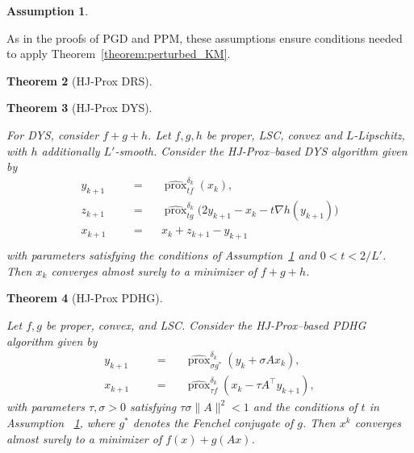 \documentclass{article}
\newcommand{\prox}{\operatorname{prox}}
\newcommand{\amp}{\mathop{\:\:\,}\nolimits}
\theoremstyle{plain}
\newtheorem{theorem}{Theorem}[section]
\theoremstyle{definition}
\newtheorem{assumption}[theorem]{Assumption}
\theoremstyle{remark}
\newtheorem{remark}[theorem]{Remark}
\begin{document}
\begin{assumption}
    \label{assump: fixed t}
\end{assumption}
As in the proofs of PGD and PPM, these assumptions ensure conditions needed to apply  Theorem~\ref{theorem:perturbed_KM}. 

\begin{theorem}[HJ-Prox DRS]
    \label{theorem:hjdrs}
\end{theorem}

\newcommand{\dysTheorem}[1]{
For DYS, consider $f + g + h$. Let $f,g,h$ be proper, LSC, convex and $L$-Lipschitz, with $h$ additionally $L'$-smooth. Consider the HJ-Prox–based DYS algorithm given by
    \begin{equation}
        \begin{split}
        y_{k+1} & \amp = \amp \widehat{\prox}^{\delta_k}_{tf}(x_k), \\
        z_{k+1} & \amp = \amp \widehat{\prox}^{\delta_k}_{tg}\bigl(2y_{k+1} - x_k - t \nabla h(y_{k+1})\bigr)\\
        x_{k+1} & \amp = \amp x_k + z_{k+1} - y_{k+1}\\
        \end{split}
    \end{equation}
    with parameters satisfying 
the conditions of Assumption~\ref{assump: fixed t} and $0< t< 2/L'$. Then $x_k$ converges almost surely to a minimizer of $f + g + h$.
}
\begin{theorem}[HJ-Prox DYS]
    \label{theorem:hjdys}
    \dysTheorem{main}
\end{theorem}
\newcommand{\pdhgTheorem}[1]{
Let $f,g$ be proper, convex, and LSC. Consider the HJ-Prox–based PDHG algorithm given by
    \begin{equation}
        \begin{split}
        y_{k+1} & \amp = \amp \widehat{\prox}^{\delta_k}_{\sigma g^*}(y_k + \sigma A x_k), \\
        x_{k+1} & \amp = \amp \widehat{\prox}^{\delta_k}_{\tau f}(x_k - \tau A^\top y_{k+1}),
        \end{split}
    \end{equation}
    with parameters $\tau,\sigma > 0$ satisfying $\tau\sigma \|A\|^2 < 1$ and
the conditions of $t$ in Assumption ~\ref{assump: fixed t}, where $g^*$ denotes the Fenchel conjugate of $g$. Then $x^k$ converges almost surely to a minimizer of $f(x)+g(Ax)$. 
}
\begin{theorem}[HJ-Prox PDHG]
    \label{theorem:hjpdhg}
    \pdhgTheorem{main}
\end{theorem}
\end{document}
